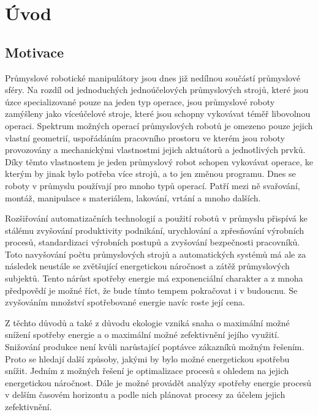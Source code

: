 

\chapter{Úvod}

\section{Motivace}

Průmyslové robotické manipulátory jsou dnes již nedílnou součástí průmyslové sféry. Na rozdíl od jednoduchých jednoúčelových průmyslových strojů, které jsou úzce specializované pouze na jeden typ operace, jsou průmyslové roboty zamýšleny jako víceúčelové stroje, které jsou schopny vykovávat téměř libovolnou operaci. Spektrum možných operací průmyslových robotů je omezeno pouze jejich vlastní geometrií, uspořádáním pracovního prostoru ve kterém jsou roboty provozovány a mechanickými vlastnostmi jejich aktuátorů a jednotlivých prvků. Díky těmto vlastnostem je jeden průmyslový robot schopen vykovávat operace, ke kterým by jinak bylo potřeba více strojů, a to jen změnou programu. Dnes se roboty v průmyslu používají pro mnoho typů operací. Patří mezi ně svařování, montáž, manipulace s materiálem, lakování, vrtání a mnoho dalších.

Rozšiřování automatizačních technologií a použití robotů v průmyslu přispívá ke stálému zvyšování produktivity podnikání, urychlování a zpřesňování výrobních procesů, standardizaci výrobních postupů a zvyšování bezpečnosti pracovníků. Toto navyšování počtu průmyslových strojů a automatických systémů má ale za následek neustále se zvětšující energetickou náročnost a zátěž průmyslových subjektů. Tento nárůst spotřeby energie má exponenciální charakter a z mnoha předpovědí je možné říct, že bude tímto tempem pokračovat i v budoucnu. Se zvyšováním množství spotřebované energie navíc roste její cena.

Z těchto důvodů a také z důvodu ekologie vzniká snaha o maximální možné snížení spotřeby energie a o maximální možné zefektivnění jejího využití. Snižování produkce není kvůli narůstající poptávce zákazníků možným řešením. Proto se hledají další způsoby, jakými by bylo možné energetickou spotřebu snížit. Jedním z možných řešení je optimalizace procesů s ohledem na jejich energetickou náročnost. Dále je možné provádět analýzy spotřeby energie procesů v delším časovém horizontu a podle nich plánovat procesy za účelem jejich zefektivnění.

